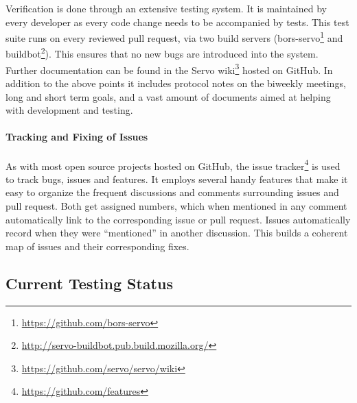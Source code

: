 \documentclass{scrartcl}
\begin{document}
Verification is done through an extensive testing system. It is maintained by every developer as every code change needs to be accompanied by tests. This test suite runs on every reviewed pull request, via two build servers (bors-servo\footnote{\url{https://github.com/bors-servo}} and buildbot\footnote{\url{http://servo-buildbot.pub.build.mozilla.org/}}). This ensures that no new bugs are introduced into the system.\\

Further documentation can be found in the Servo wiki\footnote{\url{https://github.com/servo/servo/wiki}} hosted on GitHub. In addition to the above points it includes protocol notes on the biweekly meetings, long and short term goals, and a vast amount of documents aimed at helping with development and testing.\\

\paragraph{Tracking and Fixing of Issues}
As with most open source projects hosted on GitHub, the issue tracker\footnote{\url{https://github.com/features}} is used to track bugs, issues and features. It employs several handy features that make it easy to organize the frequent discussions and comments surrounding issues and pull request. Both get assigned numbers, which when mentioned in any comment automatically link to the corresponding issue or pull request. Issues automatically record when they were ``mentioned'' in another discussion. This builds a coherent map of issues and their corresponding fixes.

\subsection{Current Testing Status} \label{test_status}
\end{document}
